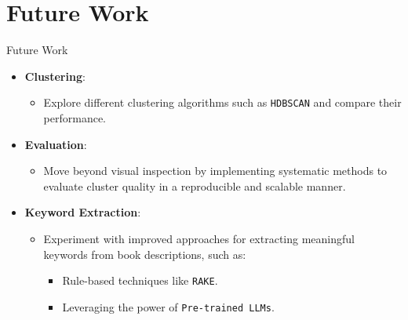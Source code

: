 \documentclass{beamer}
\begin{document}
\section{Future Work}
\begin{frame}{Future Work}
    \begin{itemize}
        \item \textbf{Clustering}:
            \begin{itemize}
                \item Explore different clustering algorithms such as \texttt{HDBSCAN} and compare their performance.
            \end{itemize}
        \item \textbf{Evaluation}:
            \begin{itemize}
                \item Move beyond visual inspection by implementing systematic methods to evaluate cluster quality in a reproducible and scalable manner.
            \end{itemize}
        \item \textbf{Keyword Extraction}:
            \begin{itemize}
                \item Experiment with improved approaches for extracting meaningful keywords from book descriptions, such as:
                    \begin{itemize}
                        \item Rule-based techniques like \texttt{RAKE}.
                        \item Leveraging the power of \texttt{Pre-trained LLMs}.
                    \end{itemize}
            \end{itemize}
    \end{itemize}
\end{frame}
\end{document}
